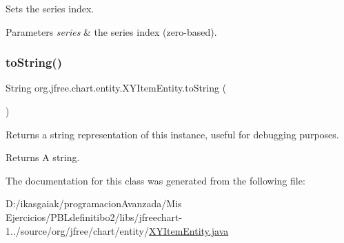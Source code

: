 Sets the series index.


\begin{DoxyParams}{Parameters}
{\em series} & the series index (zero-\/based). \\
\hline
\end{DoxyParams}
\mbox{\label{classorg_1_1jfree_1_1chart_1_1entity_1_1_x_y_item_entity_ad0138b974e5906df4416a883c288357b}} 
\subsubsection{\texorpdfstring{to\+String()}{toString()}}
{\footnotesize\ttfamily String org.\+jfree.\+chart.\+entity.\+X\+Y\+Item\+Entity.\+to\+String (\begin{DoxyParamCaption}{ }\end{DoxyParamCaption})}

Returns a string representation of this instance, useful for debugging purposes.

\begin{DoxyReturn}{Returns}
A string. 
\end{DoxyReturn}


The documentation for this class was generated from the following file\+:\begin{DoxyCompactItemize}
\item 
D\+:/ikasgaiak/programacion\+Avanzada/\+Mis Ejercicios/\+P\+B\+Ldefinitibo2/libs/jfreechart-\/1../source/org/jfree/chart/entity/\mbox{\hyperlink{_x_y_item_entity_8java}{X\+Y\+Item\+Entity.\+java}}\end{DoxyCompactItemize}
